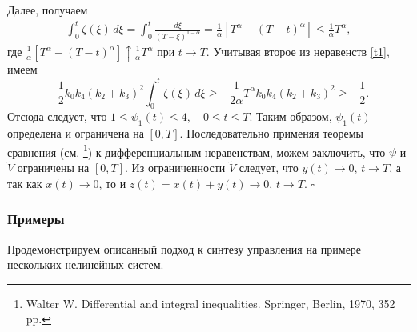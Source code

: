 \documentclass[../main.tex]{subfiles}
\begin{document}
	
	Далее, получаем \begin{gather*}
			\int^t_{0} \zeta (\xi) \, d\xi = \int^t_{0} \frac{d\xi}{(T - \xi)^{1-\alpha}} = \frac{1}{\alpha} \left[ T ^\alpha -  (T - t)^\alpha \right] \leqslant \frac{1}{\alpha} T ^\alpha, 
	\end{gather*}
	где $\frac{1}{\alpha} \left[T ^\alpha -  (T - t)^\alpha \right]  \uparrow  \frac{1}{\alpha} T ^\alpha$ при $ t\rightarrow T $. Учитывая второе из неравенств \eqref{t1}, имеем
	$$-\frac{1}{2} k_0 k_4 (k_2 + k_3)^2 \int^t_{0} \zeta (\xi) \, d\xi \geqslant -\frac{1}{2\alpha} T ^\alpha  k_0 k_4 (k_2 + k_3)^2 \geqslant -\frac{1}{2}. $$
	Отсюда следует, что 
	$ 1 \leqslant \psi_1(t) \leqslant 4, \quad 0 \leqslant t \leqslant T$.
	Таким образом, $\psi_1 (t)$ определена и ограничена на $[0, T]$. Последовательно применяя теоремы сравнения (см.  \footnote{Walter W. Differential and integral inequalities. Springer, Berlin, 1970, 352 pp.}) к дифференциальным неравенствам,  можем заключить, что  $\psi$ и $\widetilde{V}$ ограничены на $[0, T]$. Из ограниченности $\widetilde{V}$ следует, что $y(t) \rightarrow 0$, $t \rightarrow T$, а так как $x(t) \rightarrow 0$, то и $z(t) = x(t) + y(t) \rightarrow 0$, $t \rightarrow T$.
	\hfill $\square$
	\subsubsection{Примеры}
	
	Продемонстрируем описанный подход к синтезу управления на примере нескольких нелинейных систем. 
	
\end{document}
